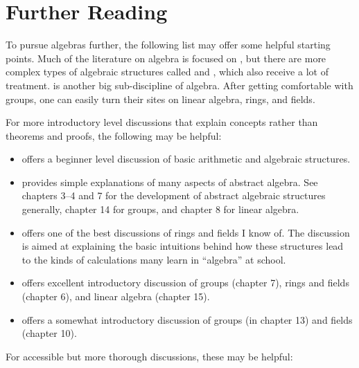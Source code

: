 \documentclass[../../../main.tex]{subfiles}
\begin{document}
\chapter{Further Reading}

To pursue algebras further, the following list may offer some helpful starting points. Much of the literature on algebra is focused on , but there are more complex types of algebraic structures called  and , which also receive a lot of treatment.  is another big sub-discipline of algebra. After getting comfortable with groups, one can easily turn their sites on linear algebra, rings, and fields.

For more introductory level discussions that explain concepts rather than theorems and proofs, the following may be helpful:

\begin{itemize}

  \item \citet[chs.~5--7]{Sawyer2007} offers a beginner level discussion of basic arithmetic and algebraic structures.
  
  \item \citet[chs.~3--4, 7, 8, and 14]{Sawyer1982} provides simple explanations of many aspects of abstract algebra. See chapters 3--4 and 7 for the development of abstract algebraic structures generally, chapter 14 for groups, and chapter 8 for linear algebra.
  
  \item \citet{Sawyer2018} offers one of the best discussions of rings and fields I know of. The discussion is aimed at explaining the basic intuitions behind how these structures lead to the kinds of calculations many learn in ``algebra'' at school.  
  
  \item \citet[chs.~6, 7, and 15]{Stewart1995} offers excellent introductory discussion of groups (chapter 7), rings and fields (chapter 6), and linear algebra (chapter 15).

  \item \citet[chs.~13 and 10]{StewartAndTall2015} offers a somewhat introductory discussion of groups (in chapter 13) and fields (chapter 10).

\end{itemize}

For accessible but more thorough discussions, these may be helpful:
\end{document}
